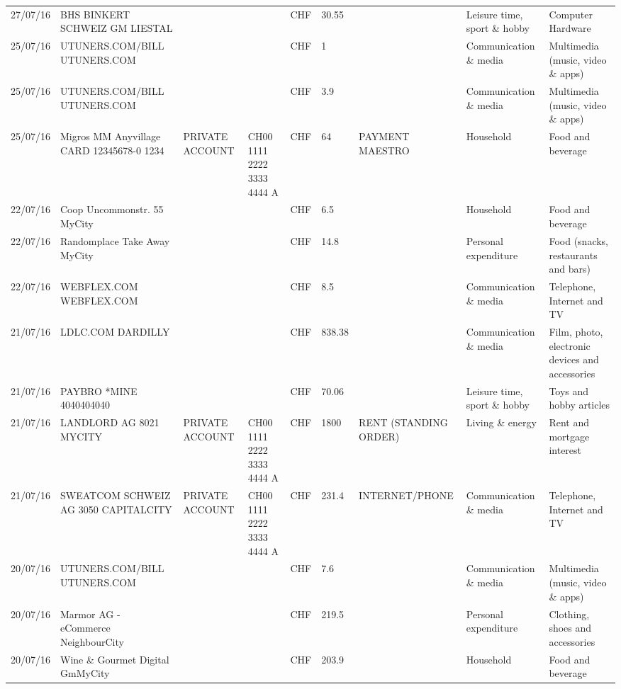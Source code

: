 \begin{landscape}
\begin{table}[t]
\begin{center}
\begin{tabular}{lllllllll}
		27/07/16 & BHS BINKERT SCHWEIZ GM   LIESTAL &       &       & CHF   & 30.55 &       & Leisure time, sport \& hobby & Computer Hardware \\
		25/07/16 & UTUNERS.COM/BILL          UTUNERS.COM &       &       & CHF   & 1     &       & Communication \& media & Multimedia (music, video \& apps) \\
		25/07/16 & UTUNERS.COM/BILL          UTUNERS.COM &       &       & CHF   & 3.9   &       & Communication \& media & Multimedia (music, video \& apps) \\
		25/07/16 & Migros MM Anyvillage CARD 12345678-0 1234 & PRIVATE ACCOUNT & CH00 1111 2222 3333 4444 A & CHF   & 64    & PAYMENT MAESTRO & Household & Food and beverage \\
		22/07/16 & Coop Uncommonstr. 55   MyCity &       &       & CHF   & 6.5   &       & Household & Food and beverage \\
		22/07/16 & Randomplace Take Away     MyCity &       &       & CHF   & 14.8  &       & Personal expenditure & Food (snacks, restaurants and bars) \\
		22/07/16 & WEBFLEX.COM              WEBFLEX.COM &       &       & CHF   & 8.5   &       & Communication \& media & Telephone,  Internet and TV \\
		21/07/16 & LDLC.COM                 DARDILLY &       &       & CHF   & 838.38 &       & Communication \& media & Film, photo, electronic devices and accessories \\
		21/07/16 & PAYBRO *MINE       4040404040 &       &       & CHF   & 70.06 &       & Leisure time, sport \& hobby & Toys and hobby articles \\
		21/07/16 & LANDLORD AG 8021 MYCITY & PRIVATE ACCOUNT & CH00 1111 2222 3333 4444 A & CHF   & 1800  & RENT (STANDING ORDER) & Living \& energy & Rent and mortgage interest \\
		21/07/16 & SWEATCOM SCHWEIZ AG 3050 CAPITALCITY & PRIVATE ACCOUNT & CH00 1111 2222 3333 4444 A & CHF   & 231.4 & INTERNET/PHONE & Communication \& media & Telephone,  Internet and TV \\
		20/07/16 & UTUNERS.COM/BILL          UTUNERS.COM &       &       & CHF   & 7.6   &       & Communication \& media & Multimedia (music, video \& apps) \\
		20/07/16 & Marmor AG - eCommerce     NeighbourCity &       &       & CHF   & 219.5 &       & Personal expenditure & Clothing, shoes and accessories \\
		20/07/16 & Wine \& Gourmet Digital GmMyCity &       &       & CHF   & 203.9 &       & Household & Food and beverage \\

\end{tabular}
\end{center}
\end{table}
\end{landscape}
